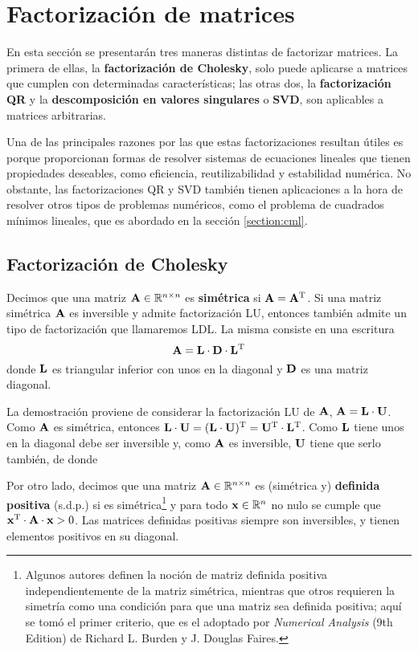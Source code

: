 
\section{Factorización de matrices}
\label{section:factorizacion-matrices}

En esta sección se presentarán tres maneras distintas de factorizar matrices.
La primera de ellas, la \textbf{factorización de Cholesky}, solo puede
aplicarse a matrices que cumplen con determinadas características; las otras
dos, la \textbf{factorización QR} y la \textbf{descomposición en valores
singulares} o \textbf{SVD}, son aplicables a matrices arbitrarias.

Una de las principales razones por las que estas factorizaciones resultan
útiles es porque proporcionan formas de resolver sistemas de ecuaciones
lineales que tienen propiedades deseables, como eficiencia, reutilizabilidad
y estabilidad numérica. No obstante, las factorizaciones QR y SVD también
tienen aplicaciones a la hora de resolver otros tipos de problemas numéricos,
como el problema de cuadrados mínimos lineales, que es abordado en la
sección \ref{section:cml}.

\subsection{Factorización de Cholesky}

Decimos que una matriz $\mathbf{A} \in \mathbb{R}^{n \times n}$ es
\textbf{simétrica} si $\mathbf{A} = \mathbf{A}^{\mathrm{T}}$.
Si una matriz simétrica $\mathbf{A}$ es inversible y admite factorización LU,
entonces también admite un tipo de factorización que llamaremos LDL.
La misma consiste en una escritura
\[ \mathbf{A} = \mathbf{L} \cdot \mathbf{D} \cdot \mathbf{L}^{\mathrm{T}} \]
donde $\mathbf{L}$ es triangular inferior con unos en la diagonal y $\mathbf{D}$
es una matriz diagonal.

La demostración proviene de considerar la factorización LU de $\mathbf{A}$,
$\mathbf{A} = \mathbf{L} \cdot \mathbf{U}$. Como $\mathbf{A}$ es simétrica, entonces
$\mathbf{L} \cdot \mathbf{U} = (\mathbf{L} \cdot \mathbf{U})^{\mathrm{T}} =
\mathbf{U}^{\mathrm{T}} \cdot \mathbf{L}^{\mathrm{T}}$. Como $\mathbf{L}$ tiene unos en la diagonal
debe ser inversible y, como $\mathbf{A}$ es inversible, $\mathbf{U}$ tiene que
serlo también, de donde %

Por otro lado, decimos que una matriz $\mathbf{A} \in \mathbb{R}^{n \times n}$
es (simétrica y) \textbf{definida positiva} (s.d.p.) si es
simétrica\footnote{Algunos autores definen la noción de matriz definida
positiva independientemente de la matriz simétrica, mientras que otros
requieren la simetría como una condición para que una matriz sea definida
positiva; aquí se tomó el primer criterio, que es el adoptado por
\emph{Numerical Analysis} (9th Edition) de Richard L. Burden y J. Douglas
Faires.}
y para todo $\mathbf{x} \in \mathbb{R}^{n}$ no nulo se cumple que
$\mathbf{x}^{\mathrm{T}} \cdot \mathbf{A} \cdot \mathbf{x} > 0$. Las matrices definidas positivas siempre son inversibles, y tienen elementos positivos en su diagonal.

